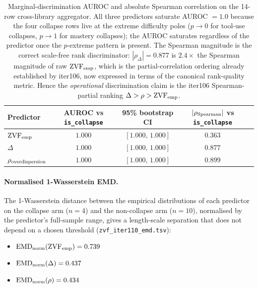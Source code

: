 \begin{table}[ht]\centering\small
\begin{tabular}{lcccc}
\toprule
Predictor & AUROC vs \texttt{is\_collapse} & 95\% bootstrap CI & $|\rho_{\rm Spearman}|$ vs \texttt{is\_collapse} \\
\midrule
$\mathrm{ZVF}_{\rm emp}$       & $1.000$ & $[1.000,\,1.000]$ & $0.363$ \\
$\Delta$                      & $1.000$ & $[1.000,\,1.000]$ & $\mathbf{0.877}$ \\
$\rho_{\rm overdispersion}$   & $1.000$ & $[1.000,\,1.000]$ & $0.899$ \\
\bottomrule
\end{tabular}
\caption{Marginal-discrimination AUROC and absolute Spearman correlation
on the 14-row cross-library aggregator. All three predictors saturate
AUROC $= 1.0$ because the four collapse rows live at the extreme
difficulty poles ($p\!\to\!0$ for tool-use collapses, $p\!\to\!1$ for
mastery collapses); the AUROC saturates regardless of the predictor
once the $p$-extreme pattern is present. The Spearman magnitude is the
correct scale-free rank discriminator: $|\rho_{\Delta}|=0.877$ is
$2.4\times$ the Spearman magnitude of raw $\mathrm{ZVF}_{\rm emp}$,
which is the partial-correlation ordering already established by
iter106, now expressed in terms of the canonical rank-quality
metric. Hence the \emph{operational} discrimination claim is the
iter106 Spearman-partial ranking $\Delta > \rho > \mathrm{ZVF}_{\rm emp}$.}
\label{tab:zvf-auroc}
\end{table}

\paragraph{Normalised 1-Wasserstein EMD.}
The 1-Wasserstein distance between the empirical distributions of
each predictor on the collapse arm ($n{=}4$) and the non-collapse arm
($n{=}10$), normalised by the predictor's full-sample range, gives a
length-scale separation that does not depend on a chosen threshold
(\texttt{zvf\_iter110\_emd.tsv}):

\begin{itemize}
\item $\mathrm{EMD}_{\rm norm}(\mathrm{ZVF}_{\rm emp}) = 0.739$
\item $\mathrm{EMD}_{\rm norm}(\Delta) = 0.437$
\item $\mathrm{EMD}_{\rm norm}(\rho) = 0.434$
\end{itemize}

